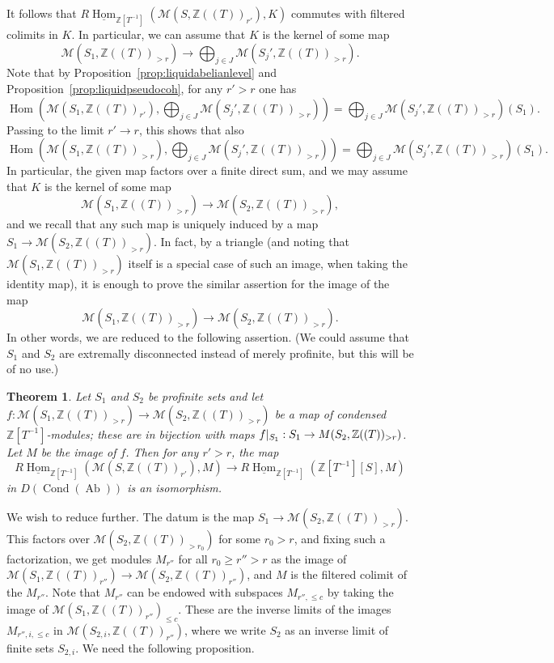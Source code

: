 \documentclass[11pt]{amsbook}
\DeclareMathOperator{\Hom}{Hom}
\newcommand{\intHom}{\underline{\Hom}}
\DeclareMathOperator{\Cond}{Cond}
\DeclareMathOperator{\Ab}{Ab}
\numberwithin{equation}{section}
\newtheorem{theorem}{Theorem}
\numberwithin{theorem}{section}
\theoremstyle{definition}
\begin{document}
It follows that $R\intHom_{\mathbb Z[T^{-1}]}(\mathcal M(S,\mathbb Z((T))_{r'}),K)$ commutes with filtered colimits in $K$. In particular, we can assume that $K$ is the kernel of some map
\[
\mathcal M(S_1,\mathbb Z((T))_{>r})\to \bigoplus_{j\in J} \mathcal M(S_j',\mathbb Z((T))_{>r}).
\]
Note that by Proposition~\ref{prop:liquidabelianlevel} and Proposition~\ref{prop:liquidpseudocoh}, for any $r'>r$ one has
\[
\Hom(\mathcal M(S_1,\mathbb Z((T))_{r'}),\bigoplus_{j\in J} \mathcal M(S_j',\mathbb Z((T))_{>r})) = \bigoplus_{j\in J} \mathcal M(S_j',\mathbb Z((T))_{>r})(S_1).
\]
Passing to the limit $r'\to r$, this shows that also
\[
\Hom(\mathcal M(S_1,\mathbb Z((T))_{>r}),\bigoplus_{j\in J} \mathcal M(S_j',\mathbb Z((T))_{>r})) = \bigoplus_{j\in J} \mathcal M(S_j',\mathbb Z((T))_{>r})(S_1).
\]
In particular, the given map factors over a finite direct sum, and we may assume that $K$ is the kernel of some map
\[
\mathcal M(S_1,\mathbb Z((T))_{>r})\to \mathcal M(S_2,\mathbb Z((T))_{>r}),
\]
and we recall that any such map is uniquely induced by a map $S_1\to \mathcal M(S_2,\mathbb Z((T))_{>r})$. In fact, by a triangle (and noting that $\mathcal M(S_1,\mathbb Z((T))_{>r})$ itself is a special case of such an image, when taking the identity map), it is enough to prove the similar assertion for the image of the map
\[
\mathcal M(S_1,\mathbb Z((T))_{>r})\to \mathcal M(S_2,\mathbb Z((T))_{>r}).
\]
In other words, we are reduced to the following assertion. (We could assume that $S_1$ and $S_2$ are extremally disconnected instead of merely profinite, but this will be of no use.)

\begin{theorem} Let $S_1$ and $S_2$ be profinite sets and let $f: \mathcal M(S_1,\mathbb Z((T))_{>r})\to \mathcal M(S_2,\mathbb Z((T))_{>r})$ be a map of condensed $\mathbb Z[T^{-1}]$-modules; these are in bijection with maps $f|_{S_1}: S_1\to \mathbb \mathcal M(S_2,\mathbb Z((T))_{>r})$. Let $M$ be the image of $f$. Then for any $r'>r$, the map
\[
R\intHom_{\mathbb Z[T^{-1}]}(\mathcal M(S,\mathbb Z((T))_{r'}),M)\to R\intHom_{\mathbb Z[T^{-1}]}(\mathbb Z[T^{-1}][S],M)
\]
in $D(\Cond(\Ab))$ is an isomorphism.
\end{theorem}

We wish to reduce further. The datum is the map $S_1\to \mathcal M(S_2,\mathbb Z((T))_{>r})$. This factors over $\mathcal M(S_2,\mathbb Z((T))_{>r_0})$ for some $r_0>r$, and fixing such a factorization, we get modules $M_{r''}$ for all $r_0\geq r''>r$ as the image of $\mathcal M(S_1,\mathbb Z((T))_{r''})\to \mathcal M(S_2,\mathbb Z((T))_{r''})$, and $M$ is the filtered colimit of the $M_{r''}$. Note that $M_{r''}$ can be endowed with subspaces $M_{r'',\leq c}$ by taking the image of $\mathcal M(S_1,\mathbb Z((T))_{r''})_{\leq c}$. These are the inverse limits of the images $M_{r'',i,\leq c}$ in $\mathcal M(S_{2,i},\mathbb Z((T))_{r''})$, where we write $S_2$ as an inverse limit of finite sets $S_{2,i}$. We need the following proposition.
\end{document}
